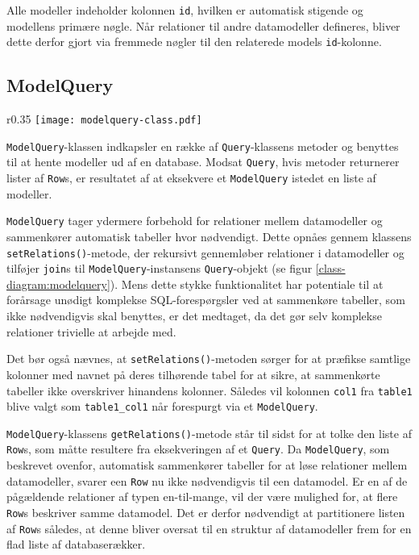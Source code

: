 Alle modeller indeholder kolonnen \texttt{id}, hvilken er automatisk stigende og modellens primære nøgle. Når relationer til andre datamodeller defineres, bliver dette derfor gjort via fremmede nøgler til den relaterede models \texttt{id}-kolonne.

\subsection{ModelQuery}

\begin{wrapfigure}{r}{0.35\textwidth}
  \centering
  \vspace{-12pt}
  \texttt{[image: modelquery-class.pdf]}
  \caption{Klassediagram for \texttt{ModelQuery}}
  \label{class-diagram:modelquery}
\end{wrapfigure}

\texttt{ModelQuery}-klassen indkapsler en række af \texttt{Query}-klassens metoder og benyttes til at hente modeller ud af en database. Modsat \texttt{Query}, hvis metoder returnerer lister af \texttt{Row}s, er resultatet af at eksekvere et \texttt{ModelQuery} istedet en liste af modeller.

\texttt{ModelQuery} tager ydermere forbehold for relationer mellem datamodeller og sammenkører automatisk tabeller hvor nødvendigt. Dette opnåes gennem klassens \texttt{setRelations()}-metode, der rekursivt gennemløber relationer i datamodeller og tilføjer \texttt{join}s til \texttt{ModelQuery}-instansens \texttt{Query}-objekt (se figur \ref{class-diagram:modelquery}). Mens dette stykke funktionalitet har potentiale til at forårsage unødigt komplekse SQL-forespørgsler ved at sammenkøre tabeller, som ikke nødvendigvis skal benyttes, er det medtaget, da det gør selv komplekse relationer trivielle at arbejde med.

Det bør også nævnes, at \texttt{setRelations()}-metoden sørger for at præfikse samtlige kolonner med navnet på deres tilhørende tabel for at sikre, at sammenkørte tabeller ikke overskriver hinandens kolonner. Således vil kolonnen \texttt{col1} fra \texttt{table1} blive valgt som \texttt{table1\_col1} når forespurgt via et \texttt{ModelQuery}.

\texttt{ModelQuery}-klassens \texttt{getRelations()}-metode står til sidst for at tolke den liste af \texttt{Row}s, som måtte resultere fra eksekveringen af et \texttt{Query}. Da \texttt{ModelQuery}, som beskrevet ovenfor, automatisk sammenkører tabeller for at løse relationer mellem datamodeller, svarer een \texttt{Row} nu ikke nødvendigvis til een datamodel. Er en af de pågældende relationer af typen en-til-mange, vil der være mulighed for, at flere \texttt{Row}s beskriver samme datamodel. Det er derfor nødvendigt at partitionere listen af \texttt{Row}s således, at denne bliver oversat til en struktur af datamodeller frem for en flad liste af databaserækker.

